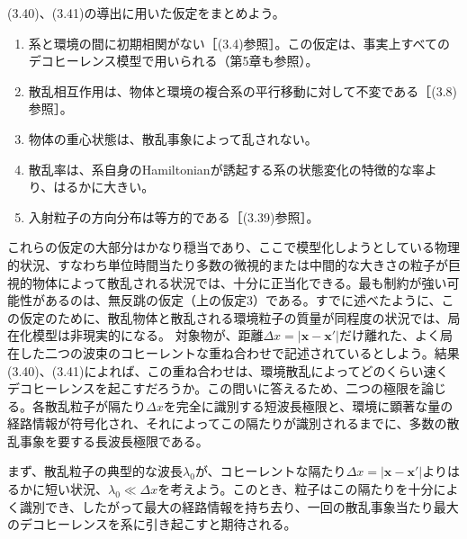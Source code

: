 (3.40)、(3.41)の導出に用いた仮定をまとめよう。
\begin{enumerate}
\item 系と環境の間に初期相関がない［(3.4)参照］。この仮定は、事実上すべてのデコヒーレンス模型で用いられる（第5章も参照）。
\item 散乱相互作用は、物体と環境の複合系の平行移動に対して不変である［(3.8)参照］。
\item 物体の重心状態は、散乱事象によって乱されない。
\item 散乱率は、系自身のHamiltonianが誘起する系の状態変化の特徴的な率より、はるかに大きい。
\item 入射粒子の方向分布は等方的である［(3.39)参照］。
\end{enumerate}
\hypertarget{srcpage:128}{}\label{srcpage:128}
これらの仮定の大部分はかなり穏当であり、ここで模型化しようとしている物理的状況、すなわち単位時間当たり多数の微視的または中間的な大きさの粒子が巨視的物体によって散乱される状況では、十分に正当化できる。最も制約が強い可能性があるのは、無反跳の仮定（上の仮定3）である。すでに述べたように、この仮定のために、散乱物体と散乱される環境粒子の質量が同程度の状況では、局在化模型は非現実的になる。
対象物が、距離$\Delta x=|\bm x-\bm x'|$だけ離れた、よく局在した二つの波束のコヒーレントな重ね合わせで記述されているとしよう。結果(3.40)、(3.41)によれば、この重ね合わせは、環境散乱によってどのくらい速くデコヒーレンスを起こすだろうか。この問いに答えるため、二つの極限を論じる。各散乱粒子が隔たり$\Delta x$を完全に識別する短波長極限と、環境に顕著な量の経路情報が符号化され、それによってこの隔たりが識別されるまでに、多数の散乱事象を要する長波長極限である。

まず、散乱粒子の典型的な波長$\lambda_0$が、コヒーレントな隔たり$\Delta x=|\bm x-\bm x'|$よりはるかに短い状況、$\lambda_0\ll\Delta x$を考えよう。このとき、粒子はこの隔たりを十分によく識別でき、したがって最大の経路情報を持ち去り、一回の散乱事象当たり最大のデコヒーレンスを系に引き起こすと期待される。

